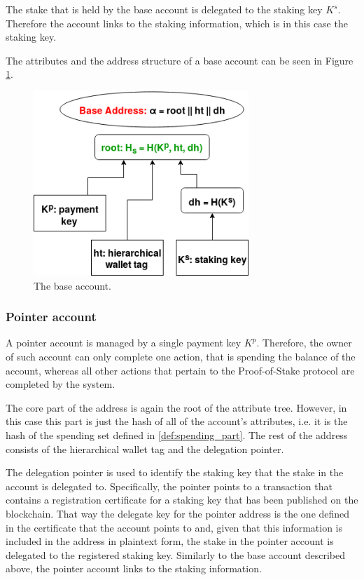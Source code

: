 The stake that is held by the base account is delegated to the staking key $K^s$. Therefore the account links to the staking information, which is in this case the staking key.

The attributes and the address structure of a base account can be seen in Figure \ref{fig:base_account_v2}.

\begin{figure}
  \begin{center}
    \includegraphics[width=230pt]{figures/base_account_v2.png}
  \end{center}
  \caption{The base account.}
  \label{fig:base_account_v2}
\end{figure}

\subsubsection{Pointer account}\label{subsubsec:pointer_account}

A pointer account is managed by a single payment key $K^p$. Therefore, the owner of such account can only complete one action, that is spending the balance of the account, whereas all other actions that pertain to the Proof-of-Stake protocol are completed by the system.

The core part of the address is again the root of the attribute tree. However, in this case this part is just the hash of all of the account's attributes, i.e. it is the hash of the spending set defined in \ref{def:spending_part}. The rest of the address consists of the hierarchical wallet tag and the delegation pointer.

The delegation pointer is used to identify the staking key that the stake in the account is delegated to. Specifically, the pointer points to a transaction that contains a registration certificate for a staking key that has been published on the blockchain. That way the delegate key for the pointer address is the one defined in the certificate that the account points to and, given that this information is included in the address in plaintext form, the stake in the pointer account is delegated to the registered staking key. Similarly to the base account described above, the pointer account links to the staking information.

